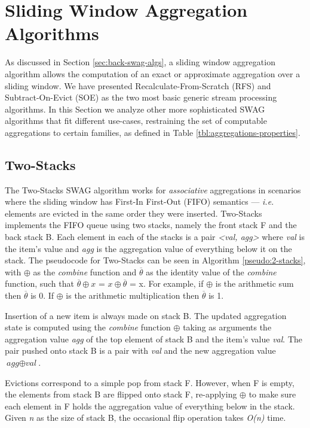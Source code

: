 \section{Sliding Window Aggregation Algorithms} \label{sec:sota-swag-algs}

As discussed in Section \ref{sec:back-swag-algs}, a sliding window aggregation algorithm allows the computation of an exact or approximate aggregation over a sliding window. We have presented Recalculate-From-Scratch (RFS) and Subtract-On-Evict (SOE) as the two most basic generic stream processing algorithms. In this Section we analyze other more sophisticated SWAG algorithms that fit different use-cases, restraining the set of computable aggregations to certain families, as defined in Table \ref{tbl:aggregations-properties}.

\subsection{Two-Stacks}
The Two-Stacks SWAG algorithm works for \textit{associative} aggregations in scenarios where the sliding window has First-In First-Out (FIFO) semantics --- \textit{i.e.} elements are evicted in the same order they were inserted. Two-Stacks \cite{Tangwongsan-DABA} implements the FIFO queue using two stacks, namely the front stack F and the back stack B. Each element in each of the stacks is a pair \textit{<val, agg>} where \textit{val} is the item's value and \textit{agg} is the aggregation value of everything below it on the stack. The pseudocode for Two-Stacks can be seen in Algorithm \ref{pseudo:2-stacks}, with $\oplus$ as the \textit{combine} function and $\overline{\theta}$ as the identity value of the \textit{combine} function, such that $\overline{\theta} \oplus x$ = $x \oplus \overline{\theta}$ = x. For example, if $\oplus$ is the arithmetic sum then $\overline{\theta}$ is 0. If $\oplus$ is the arithmetic multiplication then $\overline{\theta}$ is 1.

Insertion of a new item is always made on stack B. The updated aggregation state is computed using the \textit{combine} function $\oplus$ taking as arguments the aggregation value \textit{agg} of the top element of stack B and the item's value \textit{val}. The pair pushed onto stack B is a pair with \textit{val} and the new aggregation value $\textit{agg} \oplus \textit{val}$.

Evictions correspond to a simple pop from stack F. However, when F is empty, the elements from stack B are flipped onto stack F, re-applying $\oplus$ to make sure each element in F holds the aggregation value of everything below in the stack. Given \textit{n} as the size of stack B, the occasional flip operation takes \textit{O(n)} time.

